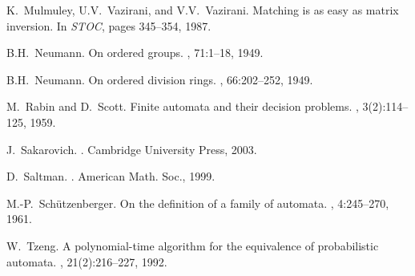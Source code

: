 \documentclass[runningheads]{llncs}
\begin{document}
\begin{thebibliography}{10}
K.~Mulmuley, U.V.~Vazirani, and V.V.~Vazirani.
\newblock Matching is as easy as matrix inversion.
\newblock In {\em STOC}, pages 345--354, 1987.

B.H.~Neumann.
\newblock On ordered groups.
, 71:1--18, 1949.

B.H.~Neumann.
\newblock On ordered division rings.
, 66:202--252, 1949.

M.~Rabin and D.~Scott.
\newblock Finite automata and their decision problems.
, 3(2):114--125, 1959.

J.~Sakarovich.
.
\newblock Cambridge University Press, 2003.

D.~Saltman.
.
\newblock American Math. Soc., 1999.

M.-P.~Sch\"{u}tzenberger.
\newblock On the definition of a family of automata.
, 4:245--270, 1961.

W.~Tzeng.
\newblock A polynomial-time algorithm for the equivalence of probabilistic
  automata.
, 21(2):216--227, 1992.

\end{thebibliography}
\end{document}

